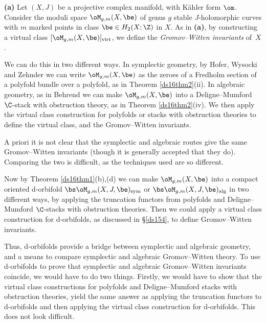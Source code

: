 \documentclass{article}
\begin{document}
\begin{rem}{\bf(a)}
 Let $(X,J)$ be a projective complex manifold, with
K\"ahler form $\om$. Consider the moduli space $\oM_{g,m}(X,\be)$
of genus $g$ stable $J$-holomorphic curves with $m$ marked points in
class $\be\in H_2(X;\Z)$ in $X$. As in {\bf(a)}, by constructing a
virtual class $[\oM_{g,m}(X,\be)]_{\rm virt}$, we
define the {\it Gromov--Witten invariants\/} of~$X$.

We can do this in two different ways. In symplectic geometry, by
Hofer, Wysocki and Zehnder \cite{HWZ6} we can write
$\oM_{g,m}(X,\be)$ as the zeroes of a Fredholm section of a
polyfold bundle over a polyfold, as in Theorem
\ref{ds16thm2}(ii). In algebraic geometry, as in Behrend \cite{Behr}
we can make $\oM_{g,m}(X,\be)$ into a
Deligne--Mumford $\C$-stack with obstruction theory, as in Theorem
\ref{ds16thm2}(iv). We then apply the virtual class construction for
polyfolds \cite{HWZ4} or stacks with obstruction theories
\cite{BeFa} to define the virtual class, and the Gromov--Witten
invariants.

A priori it is not clear that the symplectic and algebraic routes
give the same Gromov--Witten invariants (though it is generally
accepted that they do). Comparing the two is difficult, as the
techniques used are so different.

Now by Theorem \ref{ds16thm1}(b),(d) we can make $\oM_{g,m}(X,\be)$
into a compact oriented d-orbifold $\bs\oM_{g,m}(X,J,\be)_{\rm sym}$
or $\bs\oM_{g,m}(X,J,\be)_{\rm alg}$ in two different ways, by
applying the truncation functors from polyfolds and Deligne--Mumford
$\C$-stacks with obstruction theories. Then we could apply
a virtual class construction for d-orbifolds, as discussed in
\S\ref{ds154}, to define Gromov--Witten invariants.

Thus, d-orbifolds provide a bridge between symplectic and algebraic
geometry, and a means to compare symplectic and algebraic
Gromov--Witten theory. To use d-orbifolds to prove that symplectic
and algebraic Gromov--Witten invariants coincide, we would have to
do two things. Firstly, we would have to show that the virtual class
constructions for polyfolds and Deligne--Mumford stacks
with obstruction theories, yield the same answer as applying the
truncation functors to d-orbifolds and then applying the virtual
class construction for d-orbifolds. This does not look difficult.


\end{rem}
\end{document}
